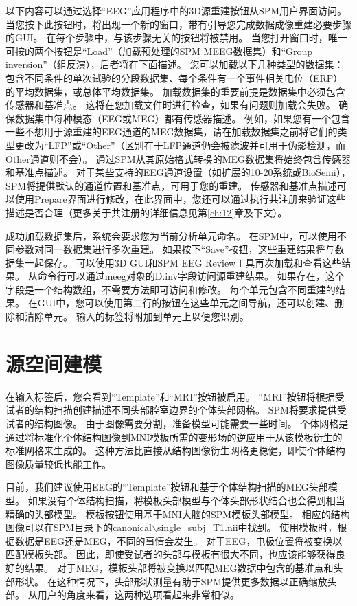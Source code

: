 以下内容可以通过选择“EEG”应用程序中的3D源重建按钮从SPM用户界面访问。
当您按下此按钮时，将出现一个新的窗口，带有引导您完成数据成像重建必要步骤的GUI。
在每个步骤中，与该步骤无关的按钮将被禁用。
当您打开窗口时，唯一可按的两个按钮是“Load”（加载预处理的SPM MEEG数据集）和“Group inversion”（组反演），后者将在下面描述。
您可以加载以下几种类型的数据集：包含不同条件的单次试验的分段数据集、每个条件有一个事件相关电位（ERP）的平均数据集，或总体平均数据集。
加载数据集的重要前提是数据集中必须包含传感器和基准点。
这将在您加载文件时进行检查，如果有问题则加载会失败。
确保数据集中每种模态（EEG或MEG）都有传感器描述。
例如，如果您有一个包含一些不想用于源重建的EEG通道的MEG数据集，请在加载数据集之前将它们的类型更改为“LFP”或“Other”（区别在于LFP通道仍会被滤波并可用于伪影检测，而Other通道则不会）。
通过SPM从其原始格式转换的MEG数据集将始终包含传感器和基准点描述。
对于某些支持的EEG通道设置（如扩展的10-20系统或BioSemi），SPM将提供默认的通道位置和基准点，可用于您的重建。
传感器和基准点描述可以使用Prepare界面进行修改，在此界面中，您还可以通过执行共注册来验证这些描述是否合理（更多关于共注册的详细信息见第\ref{ch:12}章及下文）。

成功加载数据集后，系统会要求您为当前分析单元命名。
在SPM中，可以使用不同参数对同一数据集进行多次重建。
如果按下“Save”按钮，这些重建结果将与数据集一起保存。
可以使用3D GUI和SPM EEG Review工具再次加载和查看这些结果。
从命令行可以通过meeg对象的D.inv字段访问源重建结果。
如果存在，这个字段是一个结构数组，不需要方法即可访问和修改。
每个单元包含不同重建的结果。
在GUI中，您可以使用第二行的按钮在这些单元之间导航，还可以创建、删除和清除单元。
输入的标签将附加到单元上以便您识别。


\section{源空间建模}

在输入标签后，您会看到“Template”和“MRI”按钮被启用。
“MRI”按钮将根据受试者的结构扫描创建描述不同头部腔室边界的个体头部网格。
SPM将要求提供受试者的结构图像。
由于图像需要分割，准备模型可能需要一些时间。
个体网格是通过将标准化个体结构图像到MNI模板所需的变形场的逆应用于从该模板衍生的标准网格来生成的。
这种方法比直接从结构图像衍生网格更稳健，即使个体结构图像质量较低也能工作。

目前，我们建议使用EEG的“Template”按钮和基于个体结构扫描的MEG头部模型。
如果没有个体结构扫描，将模板头部模型与个体头部形状结合也会得到相当精确的头部模型。
模板按钮使用基于MNI大脑的SPM模板头部模型。
相应的结构图像可以在SPM目录下的canonical$\backslash$single\_subj\_T1.nii中找到。
使用模板时，根据数据是EEG还是MEG，不同的事情会发生。
对于EEG，电极位置将被变换以匹配模板头部。
因此，即使受试者的头部与模板有很大不同，也应该能够获得良好的结果。
对于MEG，模板头部将被变换以匹配MEG数据中包含的基准点和头部形状。
在这种情况下，头部形状测量有助于SPM提供更多数据以正确缩放头部。
从用户的角度来看，这两种选项看起来非常相似。

